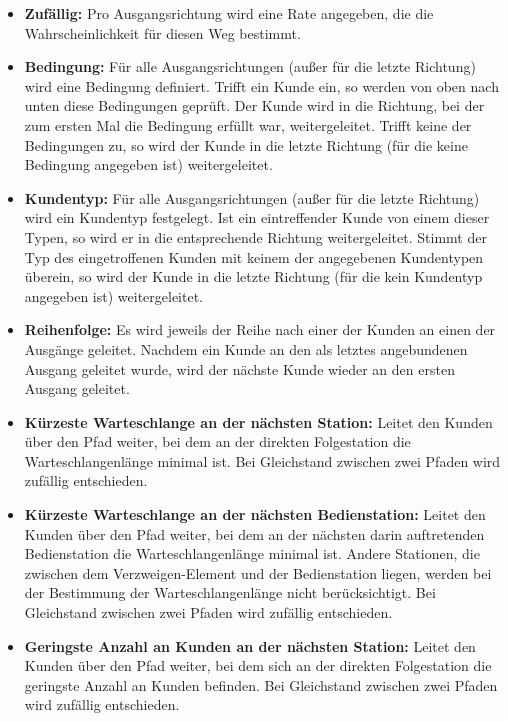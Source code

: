 \begin{itemize}
  \item 
    \textbf{Zufällig:}
    Pro Ausgangsrichtung wird eine Rate angegeben, die die Wahrscheinlichkeit für diesen Weg bestimmt.

  \item 
    \textbf{Bedingung:}
    Für alle Ausgangsrichtungen (außer für die letzte Richtung) wird eine Bedingung definiert. Trifft ein
    Kunde ein, so werden von oben nach unten diese Bedingungen geprüft. Der Kunde wird in die Richtung,
    bei der zum ersten Mal die Bedingung erfüllt war, weitergeleitet. Trifft keine der Bedingungen zu,
    so wird der Kunde in die letzte Richtung (für die keine Bedingung angegeben ist) weitergeleitet.    

  \item 
    \textbf{Kundentyp:}
    Für alle Ausgangsrichtungen (außer für die letzte Richtung) wird ein Kundentyp festgelegt. Ist ein
    eintreffender Kunde von einem dieser Typen, so wird er in die entsprechende Richtung weitergeleitet.
    Stimmt der Typ des eingetroffenen Kunden mit keinem der angegebenen Kundentypen überein,
    so wird der Kunde in die letzte Richtung (für die kein Kundentyp angegeben ist) weitergeleitet.

  \item 
    \textbf{Reihenfolge:}
    Es wird jeweils der Reihe nach einer der Kunden an einen der Ausgänge geleitet. Nachdem ein Kunde
    an den als letztes angebundenen Ausgang geleitet wurde, wird der nächste Kunde wieder an den
    ersten Ausgang geleitet. 

  \item 
    \textbf{Kürzeste Warteschlange an der nächsten Station:}
    Leitet den Kunden über den Pfad weiter, bei dem an der direkten Folgestation
    die Warteschlangenlänge minimal ist. Bei Gleichstand zwischen zwei Pfaden wird
    zufällig entschieden.

  \item 
    \textbf{Kürzeste Warteschlange an der nächsten Bedienstation:}
    Leitet den Kunden über den Pfad weiter, bei dem an der nächsten
    darin auftretenden Bedienstation die Warteschlangenlänge minimal ist.
    Andere Stationen, die zwischen dem Verzweigen-Element und der
    Bedienstation liegen, werden bei der Bestimmung der Warteschlangenlänge
    nicht berücksichtigt. Bei Gleichstand zwischen zwei Pfaden wird
    zufällig entschieden.

  \item 
    \textbf{Geringste Anzahl an Kunden an der nächsten Station:}
    Leitet den Kunden über den Pfad weiter, bei dem sich an der direkten Folgestation
    die geringste Anzahl an Kunden befinden. Bei Gleichstand zwischen zwei Pfaden wird
    zufällig entschieden.


\end{itemize}
